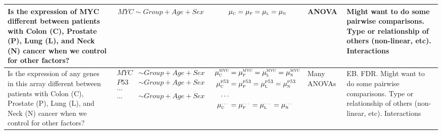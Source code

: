 \begin{frame}
\begin{textblock*}{153mm}
\begin{tabular}{>{\centering}m{2.12cm} c c p{1.0cm} m{1.52cm}}
\hline
Is the expression of MYC different between patients with Colon (C),
Prostate (P),
Lung (L), and Neck (N) cancer when we control for other factors?
& $MYC \sim Group + Age + Sex$ &
$\mu_{\textsc{c}} = \mu_{\textsc{p}} = \mu_{\textsc{l}} =
\mu_{\textsc{n}}$ & ANOVA & Might want to do some
pairwise comparisons. {\tiny Type or relationship of others (non-linear, etc). Interactions}\\
\hline

Is the expression of any genes in this array different between patients with Colon (C),
Prostate (P),
Lung (L), and Neck (N) cancer when we control for other factors?&
$\begin{aligned} MYC & \sim Group + Age + Sex\\
  P53 & \sim Group + Age + Sex\\
\ldots &\\
\ldots & \sim Group + Age + Sex\end{aligned}$
&
$\begin{aligned} 
\mu_{\textsc{c}}^{\textsc{myc}} & = \mu_{\textsc{p}}^{\textsc{myc}} = 
\mu_{\textsc{l}}^{\textsc{myc}} = \mu_{\textsc{n}}^{\textsc{myc}}\\
\mu_{\textsc{c}}^{\textsc{p53}}& = \mu_{\textsc{p}}^{\textsc{p53}} = 
\mu_{\textsc{l}}^{\textsc{p53}} = \mu_{\textsc{n}}^{\textsc{p53}}\\
\ldots & \\
\mu_{\textsc{c}}^{\textsc{\ldots}} & = \mu_{\textsc{p}}^{\textsc{\ldots}} =
\mu_{\textsc{l}}^{\textsc{\ldots}} = \mu_{\textsc{n}}^{\textsc{\ldots}}\\
\end{aligned}$
& Many ANOVAs& EB. FDR. Might want to do some
pairwise comparisons. {\tiny Type or relationship of others (non-linear, etc). Interactions} \\

\hline
\end{tabular}
\end{textblock*}
\end{frame}



